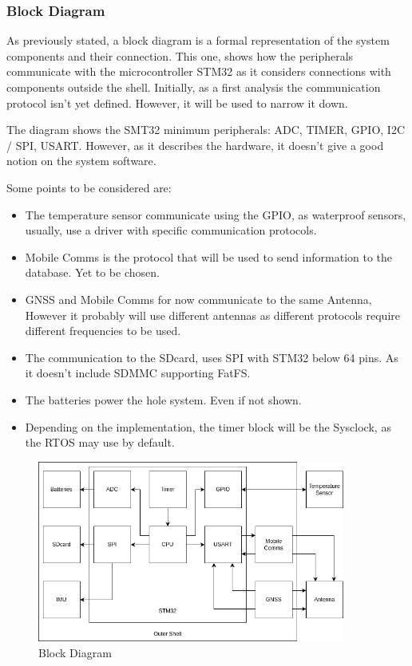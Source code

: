 \subsubsection{Block Diagram}

As previously stated, a block diagram is a formal representation of the system components
and their connection. This one, shows how the peripherals communicate with the microcontroller STM32
as it considers connections with components outside the shell. Initially, as a first analysis
the communication protocol isn't yet defined. However, it will be used to narrow it down.

The diagram shows the SMT32 minimum peripherals: ADC, TIMER, GPIO, I2C / SPI, USART. However,
as it describes the hardware, it doesn't give a good notion on the system software. 

Some points to be considered are:
\begin{itemize}
    \item The temperature sensor communicate using the GPIO, as waterproof sensors, usually, use a driver with specific
    communication protocols.
    \item Mobile Comms is the protocol that will be used to send information to the database. Yet to be chosen. 
    \item GNSS and Mobile Comms for now communicate to the same Antenna, However it probably will use different antennas as different
    protocols require different frequencies to be used.
    \item The communication to the SDcard, uses SPI with STM32 below 64 pins. As it 
    doesn't include SDMMC supporting FatFS.
    \item The batteries power the hole system. Even if not shown.
    \item Depending on the implementation, the timer block will be the Sysclock, as 
    the RTOS may use by default.
\end{itemize}

\begin{figure}[H]
    \centering
    \includegraphics[width=0.9\textwidth]{images/diagrams/block_diagram/block_diagrams_3/blockdiagram_analysis.drawio.png}  %
    \caption{Block Diagram}
    \label{fig:Block Diagram}        
\end{figure}


